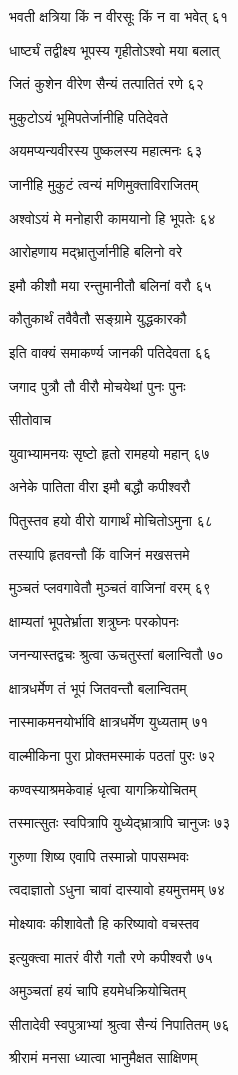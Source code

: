 भवती क्षत्रिया किं न वीरसूः किं न वा भवेत् ६१

धार्ष्ट्यं तद्वीक्ष्य भूपस्य गृहीतोऽश्वो मया बलात्

जितं कुशेन वीरेण सैन्यं तत्पातितं रणे ६२

मुकुटोऽयं भूमिपतेर्जानीहि पतिदेवते

अयमप्यन्यवीरस्य पुष्कलस्य महात्मनः ६३

जानीहि मुकुटं त्वन्यं मणिमुक्ताविराजितम्

अश्वोऽयं मे मनोहारी कामयानो हि भूपतेः ६४

आरोहणाय मद्भ्रातुर्जानीहि बलिनो वरे

इमौ कीशौ मया रन्तुमानीतौ बलिनां वरौ ६५

कौतुकार्थं तवैवैतौ सङ्ग्रामे युद्धकारकौ

इति वाक्यं समाकर्ण्य जानकी पतिदेवता ६६

जगाद पुत्रौ तौ वीरौ मोचयेथां पुनः पुनः

सीतोवाच

युवाभ्यामनयः सृष्टो हृतो रामहयो महान् ६७

अनेके पातिता वीरा इमौ बद्धौ कपीश्वरौ

पितुस्तव हयो वीरो यागार्थं मोचितोऽमुना ६८

तस्यापि हृतवन्तौ किं वाजिनं मखसत्तमे

मुञ्चतं प्लवगावेतौ मुञ्चतं वाजिनां वरम् ६९

क्षाम्यतां भूपतेर्भ्राता शत्रुघ्नः परकोपनः

जनन्यास्तद्वचः श्रुत्वा ऊचतुस्तां बलान्वितौ ७०

क्षात्रधर्मेण तं भूपं जितवन्तौ बलान्वितम्

नास्माकमनयोर्भावि क्षात्रधर्मेण युध्यताम् ७१

वाल्मीकिना पुरा प्रोक्तमस्माकं पठतां पुरः ७२

कण्वस्याश्रमकेवाहं धृत्वा यागक्रियोचितम्

तस्मात्सुतः स्वपित्रापि युध्येद्भ्रात्रापि चानुजः ७३

गुरुणा शिष्य एवापि तस्मान्नो पापसम्भवः

त्वदाज्ञातो ऽधुना चावां दास्यावो हयमुत्तमम् ७४

मोक्ष्यावः कीशावेतौ हि करिष्यावो वचस्तव

इत्युक्त्वा मातरं वीरौ गतौ रणे कपीश्वरौ ७५

अमुञ्चतां हयं चापि हयमेधक्रियोचितम्

सीतादेवी स्वपुत्राभ्यां श्रुत्वा सैन्यं निपातितम् ७६

श्रीरामं मनसा ध्यात्वा भानुमैक्षत साक्षिणम्

